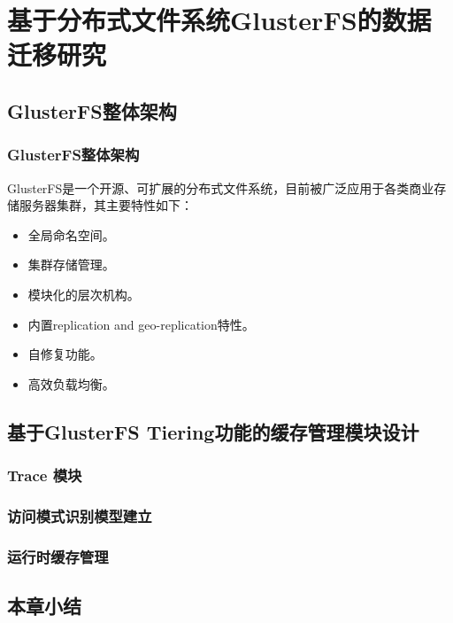 \chapter{基于分布式文件系统GlusterFS的数据迁移研究}

\section{GlusterFS整体架构}





\subsection{GlusterFS整体架构}
GlusterFS\cite{GlusterFS}是一个开源、可扩展的分布式文件系统，目前被广泛应用于各类商业存储服务器集群，其主要特性如下：
\begin{itemize}
    \item 全局命名空间。
    \item 集群存储管理。
    \item 模块化的层次机构。
    \item 内置replication and geo-replication特性。
    \item 自修复功能。
    \item 高效负载均衡。
\end{itemize}


\section{基于GlusterFS Tiering功能的缓存管理模块设计}
\subsection{Trace 模块}
\subsection{访问模式识别模型建立}
\subsection{运行时缓存管理}


\section{本章小结}
